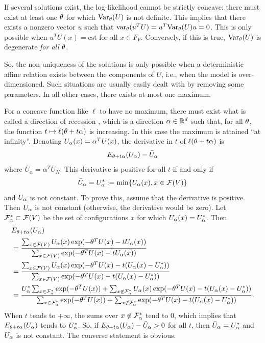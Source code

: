 If several solutions exist, the log-likelihood cannot be strictly
concave: there must exist at least one $\theta$ for which
$\text{Var}_\theta(U)$ is not definite. This implies that there exists a nonzero
vector $u$ such that
$\text{var}_\theta(u^TU)= u^T \text{Var}_\theta(U)u=0$. This is only
possible when $u^TU(x) = \text{cst}$ for all $x\in F_V$. Conversely, if this
is true, $\text{Var}_\theta(U)$ is degenerate {\em for all $\theta$}.

So, the non-uniqueness of the solutions is only possible when a
deterministic affine relation exists between the components of $U$,
i.e., when the model is over-dimen\-sioned. Such situations are usually
easily dealt with by removing some parameters. In all other cases, there exists
at most one maximum.

For a concave function like $\ell$ to have no maximum, there must exist what is
called a {direction of recession} \citep{rockafellar1970convex}, which is a  direction
$\alpha\in{\mathbb{R}}^d$ such that, for all $\theta$, the function
$t\mapsto \ell(\theta+t\alpha)$ is increasing. In this case the maximum
is attained ``at infinity''. Denoting $U_\alpha(x) = \alpha^T U(x)$, the
derivative in $t$ of $\ell(\theta+t\alpha)$ is
\[
E_{\theta+t\alpha}(U_\alpha) - \bar U_\alpha
\]
where $\bar U_\alpha = \alpha^T \bar U_N$.
This derivative is positive for all $t$ if and only if
\begin{equation}
\label{eq:recess}
\bar U_\alpha = U_\alpha^* := \min\{U_\alpha(x), x\in {\mathcal F}(V)\}
\end{equation}
and $U_\alpha$ is not constant. 
To prove this, assume that the derivative is positive. Then $U_\alpha$ is
not constant (otherwise, the derivative would be zero). Let ${\mathcal F}_\alpha^*\subset {\mathcal F}(V)$ be the set of configurations $x$
for which $U_\alpha(x) = U_\alpha^*$. Then
\begin{align*}
&E_{\theta+t\alpha}(U_\alpha)\\
 &= \frac{\sum_{x\in {\mathcal F}(V)} U_\alpha(x)
\exp(-\theta^TU(x) - tU_\alpha(x))} {\sum_{x\in {\mathcal F}(V)}
\exp(-\theta^T U(x) - tU_\alpha(x))}\\
&= \frac{\sum_{x\in {\mathcal F}(V)} U_\alpha(x)
\exp(- \theta^T U(x) - t(U_\alpha(x)-U_\alpha^*))} {\sum_{x\in {\mathcal F}(V)}
\exp(- \theta^TU(x) - t(U_\alpha(x)-U_\alpha^*))}\\
&= \frac{U_\alpha^* \sum_{x\in {\mathcal F}_\alpha^*} \exp(- \theta^TU(x))
+ \sum_{x\not\in {\mathcal F}_\alpha^*} U_\alpha(x) \exp(- \theta^TU(x) -
t(U_\alpha(x)-U_\alpha^*))} { \sum_{x\in {\mathcal F}_\alpha^*} \exp(- \theta^TU(x)) +
\sum_{x\not\in {\mathcal F}_\alpha^*} \exp(-\theta^TU(x) - t(U_\alpha(x)-U_\alpha^*))}.
\end{align*}
When $t$ tends to $+\infty$, the sums over $x\not\in
{\mathcal F}_\alpha^*$ tend to 0, which implies that 
$E_{\theta+t\alpha}(U_\alpha)$ tends to $U_\alpha^*$. So, if  
$E_{\theta+t\alpha}(U_\alpha) - \bar U_\alpha > 0$ for all $t$, then $\bar U_\alpha =
U_\alpha^*$ and $U_\alpha$ is not constant. The converse statement is obvious.

